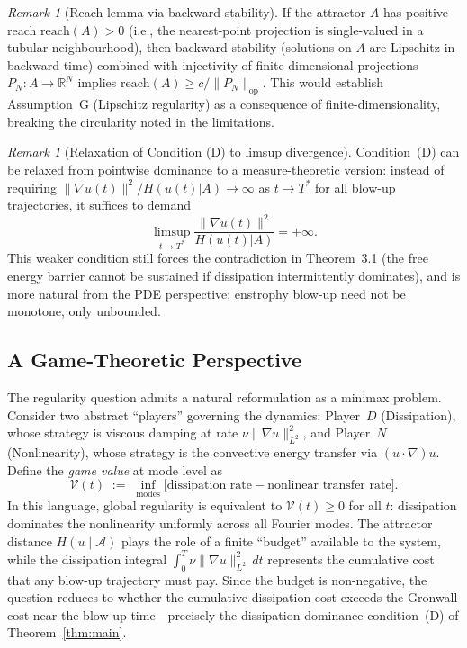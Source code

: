 \documentclass[12pt,a4paper]{article}
\theoremstyle{definition}
\theoremstyle{plain}
\theoremstyle{remark}
\newtheorem{remark}[definition]{Remark}
\begin{document}
\begin{remark}[Reach lemma via backward stability]
\label{rem:reach-lemma}
If the attractor $A$ has positive reach $\mathrm{reach}(A) > 0$ (i.e., the nearest-point projection is single-valued in a tubular neighbourhood), then backward stability (solutions on $A$ are Lipschitz in backward time) combined with injectivity of finite-dimensional projections $P_N: A \to \mathbb{R}^N$ implies $\mathrm{reach}(A) \geq c/\|P_N\|_{\mathrm{op}}$. This would establish Assumption~G (Lipschitz regularity) as a consequence of finite-dimensionality, breaking the circularity noted in the limitations.
\end{remark}

\begin{remark}[Relaxation of Condition (D) to limsup divergence]
\label{rem:condition-d-limsup}
Condition~(D) can be relaxed from pointwise dominance to a measure-theoretic version: instead of requiring $\|\nabla u(t)\|^2 / H(u(t)|A) \to \infty$ as $t \to T^*$ for all blow-up trajectories, it suffices to demand
\[
\limsup_{t \to T^*} \frac{\|\nabla u(t)\|^2}{H(u(t)|A)} = +\infty.
\]
This weaker condition still forces the contradiction in Theorem~3.1 (the free energy barrier cannot be sustained if dissipation intermittently dominates), and is more natural from the PDE perspective: enstrophy blow-up need not be monotone, only unbounded.
\end{remark}

\subsection{A Game-Theoretic Perspective}

The regularity question admits a natural reformulation as a minimax problem. Consider two abstract ``players'' governing the dynamics: Player~$D$ (Dissipation), whose strategy is viscous damping at rate $\nu\|\nabla u\|_{L^2}^2$, and Player~$N$ (Nonlinearity), whose strategy is the convective energy transfer via $(u\cdot\nabla)u$. Define the \emph{game value} at mode level as
\begin{equation}
    \mathcal{V}(t) \;:=\; \inf_{\text{modes}} \bigl[\text{dissipation rate} - \text{nonlinear transfer rate}\bigr].
\end{equation}
In this language, global regularity is equivalent to $\mathcal{V}(t) \ge 0$ for all $t$: dissipation dominates the nonlinearity uniformly across all Fourier modes. The attractor distance $H(u\mid\mathcal{A})$ plays the role of a finite ``budget'' available to the system, while the dissipation integral $\int_0^T \nu\|\nabla u\|_{L^2}^2\,dt$ represents the cumulative cost that any blow-up trajectory must pay. Since the budget is non-negative, the question reduces to whether
the cumulative dissipation cost exceeds the Gronwall cost near the
blow-up time---precisely the dissipation-dominance condition~(D)
of Theorem~\ref{thm:main}.
\end{document}
